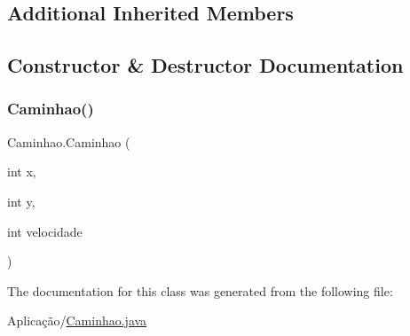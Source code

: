 \subsection*{Additional Inherited Members}


\subsection{Constructor \& Destructor Documentation}
\mbox{\label{class_caminhao_af84806c020691e90179569546094dc5a}} 
\subsubsection{\texorpdfstring{Caminhao()}{Caminhao()}}
{\footnotesize\ttfamily Caminhao.\+Caminhao (\begin{DoxyParamCaption}\item[{int}]{x,  }\item[{int}]{y,  }\item[{int}]{velocidade }\end{DoxyParamCaption})}



The documentation for this class was generated from the following file\+:\begin{DoxyCompactItemize}
\item 
Aplicação/\mbox{\hyperlink{_caminhao_8java}{Caminhao.\+java}}\end{DoxyCompactItemize}
